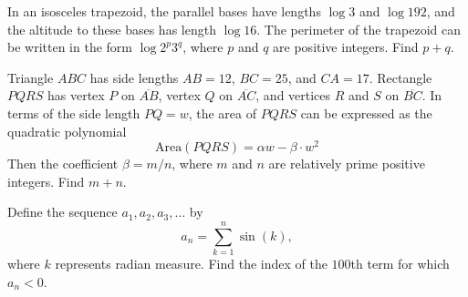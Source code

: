 \begin{question}[name={2015 AIME II, \href{https://artofproblemsolving.com/community/c4p4652169}{Problem 4}}]
	In an isosceles trapezoid, the parallel bases have lengths $\log3$ and $\log192$, and the altitude to these bases has length $\log16$. The perimeter of the trapezoid can be written in the form $\log2^p3^q$, where $p$ and $q$ are positive integers. Find $p+q$.	
	
\end{question}


%	







\begin{question}[name={2015 AIME II, \href{https://artofproblemsolving.com/community/c4p4652185}{Problem 7}}]
	Triangle $ABC$ has side lengths $AB=12$, $BC=25$, and $CA=17$. Rectangle $PQRS$ has vertex $P$ on $\overline{AB}$, vertex $Q$ on $\overline{AC}$, and vertices $R$ and $S$ on $\overline{BC}$. In terms of the side length $PQ=w$, the area of $PQRS$ can be expressed as the quadratic polynomial
	\[\text{Area}(PQRS)=\alpha w-\beta\cdot w^2\]
	Then the coefficient $\beta={m}/{n}$, where $m$ and $n$ are relatively prime positive integers. Find $m+n$.
\end{question}


%	













\begin{question}[name={2015 AIME II, \href{https://artofproblemsolving.com/community/c4p4652224}{Problem 13}}]
	Define the sequence $a_1,a_2,a_3,\ldots$ by $$a_n=\sum_{k=1}^n\sin(k),$$ where $k$ represents radian measure. Find the index of the $100$th term for which $a_n<0$.
\end{question}


%	





